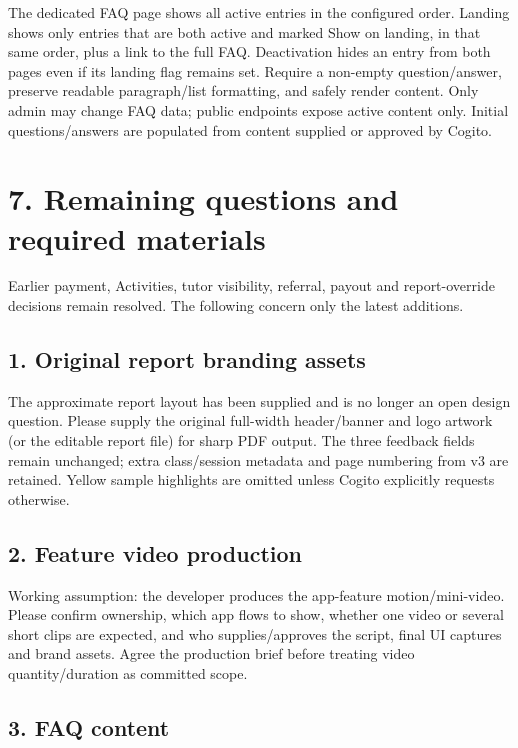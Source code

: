 \documentclass[11pt,a4paper]{article}
\begin{document}
The dedicated FAQ page shows all active entries in the configured order. Landing shows only entries that are both active and marked Show on landing, in that same order, plus a link to the full FAQ. Deactivation hides an entry from both pages even if its landing flag remains set. Require a non-empty question/\allowbreak{}answer, preserve readable paragraph/\allowbreak{}list formatting, and safely render content. Only admin may change FAQ data; public endpoints expose active content only. Initial questions/\allowbreak{}answers are populated from content supplied or approved by Cogito.

\section*{7. Remaining questions and required materials}

Earlier payment, Activities, tutor visibility, referral, payout and report-override decisions remain resolved. The following concern only the latest additions.

\subsection*{1. Original report branding assets}

The approximate report layout has been supplied and is no longer an open design question. Please supply the original full-width header/\allowbreak{}banner and logo artwork (or the editable report file) for sharp PDF output. The three feedback fields remain unchanged; extra class/\allowbreak{}session metadata and page numbering from v3 are retained. Yellow sample highlights are omitted unless Cogito explicitly requests otherwise.

\subsection*{2. Feature video production}

Working assumption: the developer produces the app-feature motion/\allowbreak{}mini-video. Please confirm ownership, which app flows to show, whether one video or several short clips are expected, and who supplies/\allowbreak{}approves the script, final UI captures and brand assets. Agree the production brief before treating video quantity/\allowbreak{}duration as committed scope.

\subsection*{3. FAQ content}
\end{document}
